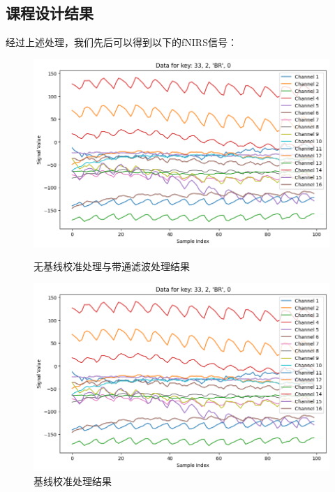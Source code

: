 \documentclass[a4paper,12pt]{article}
\begin{document}
\subsection{课程设计结果}
经过上述处理，我们先后可以得到以下的fNIRS信号：
\clearpage
\begin{figure}[h!]
    \centering
    \begin{minipage}[t]{0.48\textwidth}
        \centering
        \includegraphics[width=\linewidth]{images/Design/fNIRS_processing/noprocess.png}
        \caption{无基线校准处理与带通滤波处理结果}
    \end{minipage}
    \hfill
    \begin{minipage}[t]{0.48\textwidth}
        \centering
        \includegraphics[width=\linewidth]{images/Design/fNIRS_processing/base_line_process.png}
        \caption{基线校准处理结果}
    \end{minipage}
\end{figure}
\vspace{0.2cm}
\end{document}
